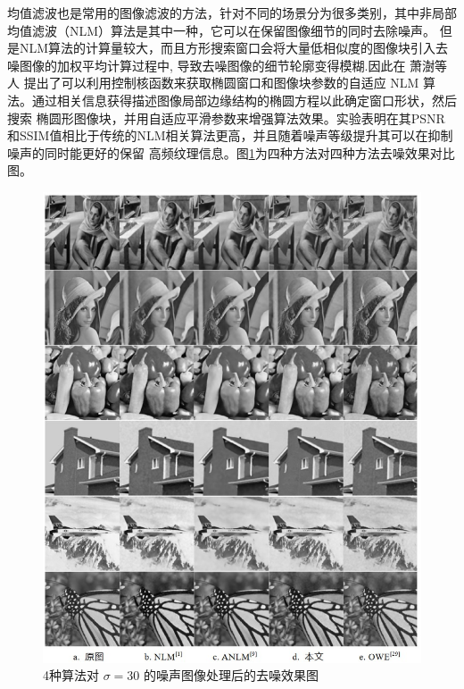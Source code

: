均值滤波也是常用的图像滤波的方法，针对不同的场景分为很多类别，其中非局部均值滤波（NLM）算法是其中一种，它可以在保留图像细节的同时去除噪声。
但是NLM算法的计算量较大，而且方形搜索窗口会将大量低相似度的图像块引入去噪图像的加权平均计算过程中, 导致去噪图像的细节轮廓变得模糊.因此在
萧澍等人\cite{xiaoTuoyuanchuangkouhecanshuzishiyingdefeijubujunzhisuanfa2020}
提出了可以利用控制核函数来获取椭圆窗口和图像块参数的自适应 NLM 算法。通过相关信息获得描述图像局部边缘结构的椭圆方程以此确定窗口形状，然后搜索
椭圆形图像块，并用自适应平滑参数来增强算法效果。实验表明在其PSNR和SSIM值相比于传统的NLM相关算法更高，并且随着噪声等级提升其可以在抑制噪声的同时能更好的保留
高频纹理信息。图\ref{06}为四种方法对四种方法去噪效果对比图。

\begin{figure}[htbp]
	\begin{center}
		\includegraphics[width = 1\textwidth]{images/06.eps}
		\caption{4种算法对 $\sigma=30$ 的噪声图像处理后的去噪效果图} 
		\label{06} %
	\end{center}
\end{figure}

